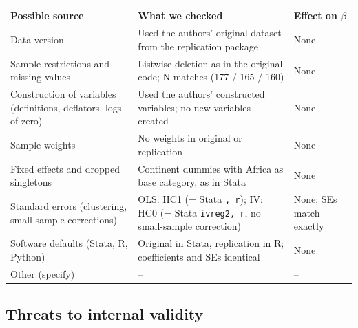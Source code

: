 \documentclass[12pt,a4paper]{article}
\renewcommand{\arraystretch}{1.25}
\begin{document}
{\renewcommand{\arraystretch}{1.4}%
\begin{tabularx}{\textwidth}{@{}>{\raggedright\arraybackslash}p{}L>{\raggedright\arraybackslash}p{0.15\textwidth}@{}}
\toprule
Possible source & What we checked & Effect on $\beta$ \\
\midrule
Data version & Used the authors' original dataset from the replication package & None \\
Sample restrictions and missing values & Listwise deletion as in the original code; N matches (177 / 165 / 160) & None \\
Construction of variables (definitions, deflators, logs of zero) & Used the authors' constructed variables; no new variables created & None \\
Sample weights & No weights in original or replication & None \\
Fixed effects and dropped singletons & Continent dummies with Africa as base category, as in Stata & None \\
Standard errors (clustering, small-sample corrections) & OLS: HC1 (= Stata \texttt{, r}); IV: HC0 (= Stata \texttt{ivreg2, r}, no small-sample correction) & None; SEs match exactly \\
Software defaults (Stata, R, Python) & Original in Stata, replication in R; coefficients and SEs identical & None \\
Other (specify) & -- & -- \\
\bottomrule
\end{tabularx}}

\subsection{Threats to internal validity}
\end{document}
